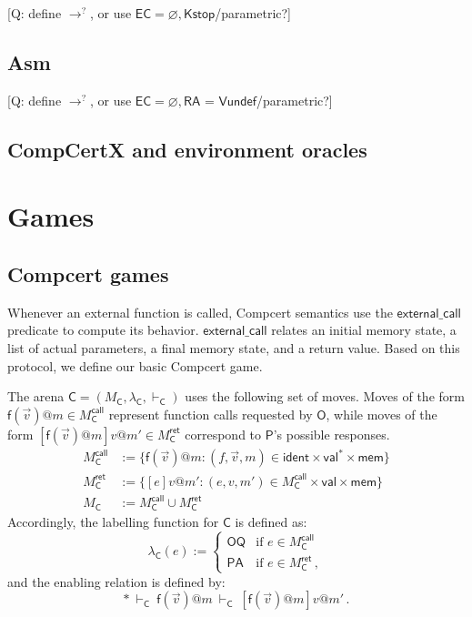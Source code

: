 \documentclass[acmsmall,anonymous,review]{acmart}
\makeatletter
\newcommand{\kw}[1]{\ensuremath{ \textsf{#1} }}
\newcommand{\EC}{\kw{C}}
\newcommand{\mcall}[3]{\kw{#1}({#2})@{#3}}
\newcommand{\mret}[2]{{#1}@{#2}}
\makeatother
\begin{document}
[Q: define $\rightarrow^?$,
or use $\textsf{EC} = \varnothing, \textsf{Kstop}$/parametric?]


\subsection{Asm} %

[Q: define $\rightarrow^?$,
or use $\textsf{EC} = \varnothing, \textsf{RA = Vundef}$/parametric?]


\subsection{CompCertX and environment oracles}


\newpage
\section{Games} %

\subsection{Compcert games} %

Whenever an external function is called,
Compcert semantics use the \kw{external\_call} predicate
to compute its behavior.
\kw{external\_call} relates an initial memory state,
a list of actual parameters,
a final memory state, and
a return value.
Based on this protocol,
we define our basic Compcert game.

\begin{definition}
The arena $\EC = (M_\EC, \lambda_\EC, \vdash_\EC)$
uses the following set of moves.
Moves of the form
$\mcall{f}{\vec{v}}{m} \in M_\EC^\kw{call}$
represent function calls requested by \kw{O},
while moves of the form
$[\mcall{f}{\vec{v}}{m}]\mret{v}{m'} \in M_\EC^\kw{ret}$
correspond to \kw{P}'s possible responses.
\begin{align*}
  M_\EC^\kw{call} &:=
    \big\{ \mcall{f}{\vec{v}}{m} :
      (f, \vec{v}, m) \in \kw{ident} \times \kw{val}^* \times \kw{mem} \big\} \\
  M_\EC^\kw{ret} &:=
    \big\{ [e]\mret{v}{m'} :
      (e, v, m') \in M_\EC^\kw{call} \times \kw{val} \times \kw{mem} \big\} \\
  M_\EC &:= M_\EC^\kw{call} \cup M_\EC^\kw{ret}
\end{align*}
Accordingly, the labelling function for $\EC$ is defined as:
\[
  \lambda_\EC(e) :=
     \begin{cases}
        \kw{OQ} & \mbox{if } e \in M_\EC^\kw{call} \\
        \kw{PA} & \mbox{if } e \in M_\EC^\kw{ret} \,,
     \end{cases}
\]
and the enabling relation is defined by:
\[
  * \ \vdash_\EC\ 
  \mcall{f}{\vec{v}}{m} \ \vdash_\EC\ 
  [\mcall{f}{\vec{v}}{m}]\mret{v}{m'} \,.
\]
\end{definition}
\end{document}
